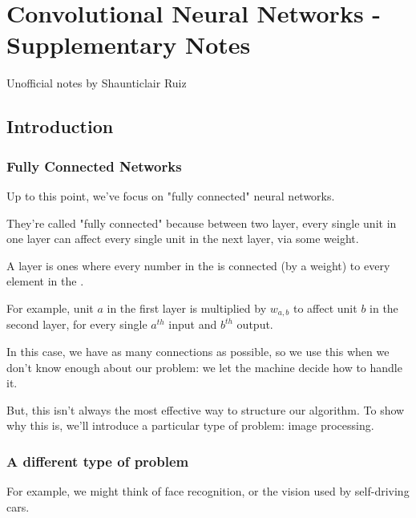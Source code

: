 

\setcounter{chapter}{6}

\chapter{Convolutional Neural Networks - Supplementary Notes}

Unofficial notes by Shaunticlair Ruiz


\section{Introduction}

    \subsection{Fully Connected Networks}

        Up to this point, we've focus on "fully connected" neural networks. 
        
        They're called "fully connected" because between two layer, every single unit in one layer can affect every single unit in the next layer, via some weight.\\
        
        \begin{definition}
            A  layer is ones where every number in the  is connected (by a weight) to every element in the . 
        \end{definition}
        
        For example, unit $a$ in the first layer is multiplied by $w_{a,b}$ to affect unit $b$ in the second layer, for every single $a^{th}$ input and $b^{th}$ output.
        
        In this case, we have as many connections as possible, so we use this when we don't know enough about our problem: we let the machine decide how to handle it.
        
        But, this isn't always the most effective way to structure our algorithm. To show why this is, we'll introduce a particular type of problem: image processing. 
    
    \subsection{A different type of problem}
    
        For example, we might think of face recognition, or the vision used by self-driving cars.
        
